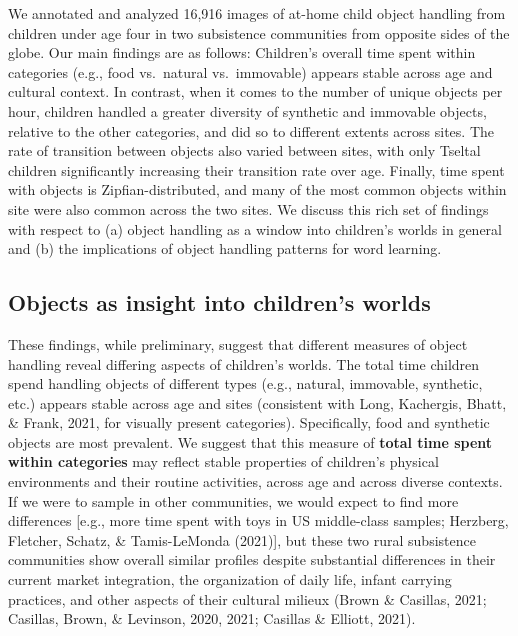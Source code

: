 \documentclass[10pt, letterpaper]{article}
\begin{document}
We annotated and analyzed 16,916 images of at-home child object handling
from children under age four in two subsistence communities from
opposite sides of the globe. Our main findings are as follows:
Children's overall time spent within categories (e.g., food vs.~natural
vs.~immovable) appears stable across age and cultural context. In
contrast, when it comes to the number of unique objects per hour,
children handled a greater diversity of synthetic and immovable objects,
relative to the other categories, and did so to different extents across
sites. The rate of transition between objects also varied between sites,
with only Tseltal children significantly increasing their transition
rate over age. Finally, time spent with objects is Zipfian-distributed,
and many of the most common objects within site were also common across
the two sites. We discuss this rich set of findings with respect to (a)
object handling as a window into children's worlds in general and (b)
the implications of object handling patterns for word learning.

\hypertarget{objects-as-insight-into-childrens-worlds}{%
\subsection{Objects as insight into children's
worlds}\label{objects-as-insight-into-childrens-worlds}}

These findings, while preliminary, suggest that different measures of
object handling reveal differing aspects of children's worlds. The total
time children spend handling objects of different types (e.g., natural,
immovable, synthetic, etc.) appears stable across age and sites
(consistent with Long, Kachergis, Bhatt, \& Frank, 2021, for visually
present categories). Specifically, food and synthetic objects are most
prevalent. We suggest that this measure of \textbf{total time spent
within categories} may reflect stable properties of children's physical
environments and their routine activities, across age and across diverse
contexts. If we were to sample in other communities, we would expect to
find more differences {[}e.g., more time spent with toys in US
middle-class samples; Herzberg, Fletcher, Schatz, \& Tamis-LeMonda
(2021){]}, but these two rural subsistence communities show overall
similar profiles despite substantial differences in their current market
integration, the organization of daily life, infant carrying practices,
and other aspects of their cultural milieux (Brown \& Casillas, 2021;
Casillas, Brown, \& Levinson, 2020, 2021; Casillas \& Elliott, 2021).
\end{document}
